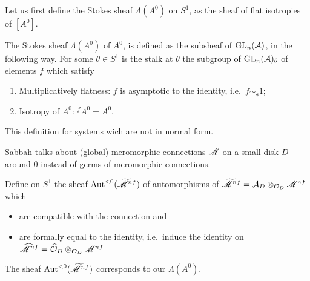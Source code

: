 Let us first define the Stokes sheaf $\Lambda(A^0)$ on $S^1$, as the sheaf of
flat isotropies of $[A^0]$.
\begin{defn}\label{defn:StokesSheaf}
  \begin{comment}
    The Stokes sheaf $\Lambda(A^0)$ of $A^0$, is the sheaf of groups defined on
    $S^1$ whose stalk at any point $\theta\in S^1$ is the group of germs of
    $f\in\Gl_n(\cO(\mathfrak{s}))$, $\mathfrak{s}$ a sector containing
    $\theta$, satisfying the conditions:
    \begin{enumerate}
      \item Flatness:
        $\underset{x\in\mathfrak{s}}{\underset{x\to0}{\lim}}f(x)=1$ and
        $f\sim_{\mathfrak{s}} 1$;
        \PROBLEM[Why two condition?]
      \item Isotropy of $A^0$: ${}^f\!A^0=A^0$.
    \end{enumerate}
  \end{comment}
  The Stokes sheaf $\Lambda(A^0)$ of $A^0$, is defined as the subsheaf of
  $\operatorname{GL}_n(\mathcal{A})$, in the following way.
  For some $\theta\in S^1$ is the stalk at $\theta$ the subgroup of
  $\operatorname{GL}_n(\mathcal{A})_\theta$ of elements $f$ which satisfy
  \begin{enumerate}
    \item Multiplicatively flatness: $f$ is asymptotic to the identity,
      i.e.\ $f\sim_{\mathfrak{s}} 1$;
    \item Isotropy of $A^0$: ${}^f\!A^0=A^0$.
  \end{enumerate}
  \begin{s-rem}
    This definition  for systems wich are not in
    normal form.
  \end{s-rem}
  \begin{s-rem}
    Sabbah \cite[110]{sabbah2007isomonodromic} talks about (global) meromorphic
    connections $\mathscr{M}$ on a small disk $D$ around $0$ instead of germs of
    meromorphic connections.

    Define on $S^1$ the sheaf $\operatorname{Aut}^{<0}(\widetilde{\mathscr{M}}^{nf})$ of automorphisms of
    $\widetilde{\mathscr{M}}^{nf}=\mathcal{A}_D\otimes_{\mathcal{O}_D}\mathscr{M}^{nf}$ which
    \begin{itemize}
      \item are compatible with the connection and
      \item are formally equal to the identity, i.e.\ induce the identity on
        $\widehat{\mathscr{M}}^{nf}=\widehat{\mathcal{O}}_D\otimes_{\mathcal{O}_D}\mathscr{M}^{nf}$
    \end{itemize}

    The sheaf $\operatorname{Aut}^{<0}(\widetilde{\mathscr{M}}^{nf})$ corresponds to our $\Lambda(A^0)$.
  \end{s-rem}
\end{defn}

